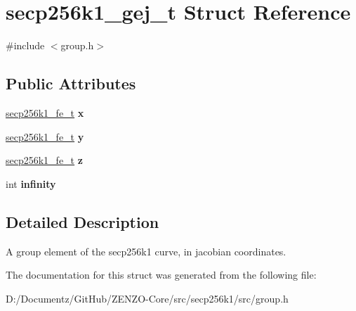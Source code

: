 \hypertarget{structsecp256k1__gej__t}{}\section{secp256k1\+\_\+gej\+\_\+t Struct Reference}
\label{structsecp256k1__gej__t}


{\ttfamily \#include $<$group.\+h$>$}

\subsection*{Public Attributes}
\begin{DoxyCompactItemize}
\item 
\mbox{\label{structsecp256k1__gej__t_a082772e446c61435cb7bb44d653832e5}} 
\mbox{\hyperlink{structsecp256k1__fe__t}{secp256k1\+\_\+fe\+\_\+t}} {\bfseries x}
\item 
\mbox{\label{structsecp256k1__gej__t_aa7f636e3d46a6e7021db2300796a1a0e}} 
\mbox{\hyperlink{structsecp256k1__fe__t}{secp256k1\+\_\+fe\+\_\+t}} {\bfseries y}
\item 
\mbox{\label{structsecp256k1__gej__t_a93369d9af4afba2d61e93e02868ea556}} 
\mbox{\hyperlink{structsecp256k1__fe__t}{secp256k1\+\_\+fe\+\_\+t}} {\bfseries z}
\item 
\mbox{\label{structsecp256k1__gej__t_a53a9190e43576d9183d5c4b653f6bbbf}} 
int {\bfseries infinity}
\end{DoxyCompactItemize}


\subsection{Detailed Description}
A group element of the secp256k1 curve, in jacobian coordinates. 

The documentation for this struct was generated from the following file\+:\begin{DoxyCompactItemize}
\item 
D\+:/\+Documentz/\+Git\+Hub/\+Z\+E\+N\+Z\+O-\/\+Core/src/secp256k1/src/group.\+h\end{DoxyCompactItemize}
